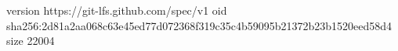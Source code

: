 version https://git-lfs.github.com/spec/v1
oid sha256:2d81a2aa068c63e45ed77d072368f319c35c4b59095b21372b23b1520eed58d4
size 22004
